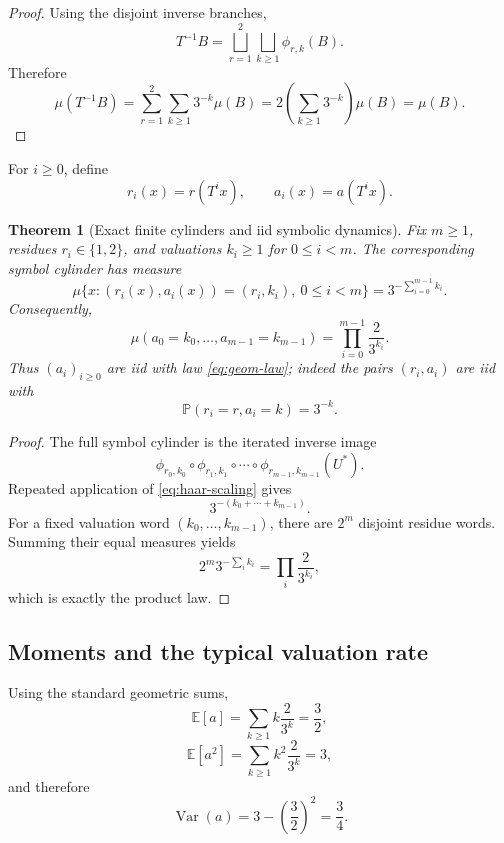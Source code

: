 \documentclass[11pt]{article}
\newtheorem{theorem}{Theorem}[section]
\theoremstyle{definition}
\theoremstyle{remark}
\newcommand{\Ustar}{U^\ast}
\newcommand{\Prob}{\mathbb P}
\newcommand{\E}{\mathbb E}
\begin{document}
\begin{proof}
Using the disjoint inverse branches,
\[
T^{-1}B
=
\bigsqcup_{r=1}^2\bigsqcup_{k\ge1}\phi_{r,k}(B).
\]
Therefore
\[
\mu(T^{-1}B)
=
\sum_{r=1}^2\sum_{k\ge1}3^{-k}\mu(B)
=
2\left(\sum_{k\ge1}3^{-k}\right)\mu(B)
=
\mu(B).
\]
\end{proof}

For $i\ge0$, define
\[
r_i(x)=r(T^i x),
\qquad
a_i(x)=a(T^i x).
\]

\begin{theorem}[Exact finite cylinders and iid symbolic dynamics]
Fix $m\ge1$, residues $r_i\in\{1,2\}$, and valuations $k_i\ge1$ for $0\le i<m$.  The corresponding symbol cylinder has measure
\begin{equation}
\boxed{
\mu\{x:(r_i(x),a_i(x))=(r_i,k_i),\ 0\le i<m\}
=
3^{-\sum_{i=0}^{m-1}k_i}.
}
\label{eq:full-cylinder}
\end{equation}
Consequently,
\begin{equation}
\boxed{
\mu(a_0=k_0,\ldots,a_{m-1}=k_{m-1})
=
\prod_{i=0}^{m-1}\frac{2}{3^{k_i}}.
}
\label{eq:iid-cylinder}
\end{equation}
Thus $(a_i)_{i\ge0}$ are iid with law \eqref{eq:geom-law}; indeed the pairs $(r_i,a_i)$ are iid with
\[
\Prob(r_i=r,a_i=k)=3^{-k}.
\]
\end{theorem}

\begin{proof}
The full symbol cylinder is the iterated inverse image
\[
\phi_{r_0,k_0}\circ\phi_{r_1,k_1}\circ\cdots\circ
\phi_{r_{m-1},k_{m-1}}(\Ustar).
\]
Repeated application of \eqref{eq:haar-scaling} gives
\[
3^{-(k_0+\cdots+k_{m-1})}.
\]
For a fixed valuation word $(k_0,\ldots,k_{m-1})$, there are $2^m$ disjoint residue words.  Summing their equal measures yields
\[
2^m3^{-\sum_i k_i}
=
\prod_i\frac{2}{3^{k_i}},
\]
which is exactly the product law.
\end{proof}

\subsection{Moments and the typical valuation rate}

Using the standard geometric sums,
\[
\E[a]
=
\sum_{k\ge1}k\frac{2}{3^k}
=
\frac32,
\]
\[
\E[a^2]
=
\sum_{k\ge1}k^2\frac{2}{3^k}
=
3,
\]
and therefore
\begin{equation}
\operatorname{Var}(a)=3-\left(\frac32\right)^2=\frac34.
\label{eq:moments}
\end{equation}
\end{document}
